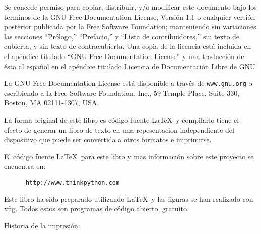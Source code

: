 \documentclass[a4paper, 11pt]{book}
\newcommand{\clearemptydoublepage}{\newpage{\pagestyle{empty}\cleardoublepage}}
\begin{document}
\vspace{0.25in}

Se concede permiso para copiar, distribuir, y/o modificar este documento bajo
los terminos de la GNU Free Documentation License, Versión 1.1 o cualquier
versión posterior publicada por la Free Software Foundation; manteniendo 
sin variaciones las secciones ``Prólogo,'' ``Prefacio,'' y ``Lista de contribuidores,''
sin texto de cubierta, y sin texto de contracubierta. Una copia de la licencia
está incluida en el apéndice titulado ``GNU Free Documentation License'' y una 
traducción de ésta al español en el apéndice titulado Licencia de Documentación Libre de GNU

La GNU Free Documentation License está disponible a través de \texttt{www.gnu.org}
o escribiendo a la Free Software Foundation, Inc., 59 Temple Place,
Suite 330, Boston, MA 02111-1307, USA.

La forma original de este libro es código fuente \LaTeX\  y compilarlo
tiene el efecto de generar un libro de texto en una 
repesentacion independiente del dispositivo que puede ser convertida a otros 
formatos e imprimirse.

El código  fuente \LaTeX\  para este libro y mas información sobre este proyecto
se encuentra en:

\begin{verbatim}
      http://www.thinkpython.com
\end{verbatim}

Este libro ha sido preparado utilizando \LaTeX\ y las figuras
se han realizado con xfig.  Todos estos son programas de código
abierto, gratuito.

\vspace{0.25in}

Historia de la impresión:



\begin{verbatim}

\end{verbatim}



 	\clearemptydoublepage
  	\clearemptydoublepage
  	\clearemptydoublepage
	\clearemptydoublepage
\end{document}

